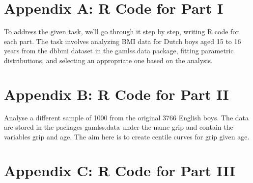 \documentclass{article}
\begin{document}
\newpage

\singlespacing 
\tableofcontents
\listoffigures
\listoftables
\doublespacing

\newpage



\pagebreak



\pagebreak



\pagebreak



%

\pagebreak



\singlespace
\pagebreak

\printbibliography

\pagebreak

\appendix

\section{Appendix A: R Code for Part I}

To address the given task, we’ll go through it step by step, writing R code for each part. The task involves analyzing BMI data for Dutch boys aged 15 to 16 years from the dbbmi dataset in the gamlss.data package, fitting parametric distributions, and selecting an appropriate one based on the analysis.



\section{Appendix B: R Code for Part II}



Analyse a different sample of 1000 from the original 3766 English boys. The data are stored in the packages gamlss.data under the name grip and contain the variables grip and age. The aim here is to create centile curves for grip given age.

\pagebreak

\section{Appendix C: R Code for Part III}


\end{document}

